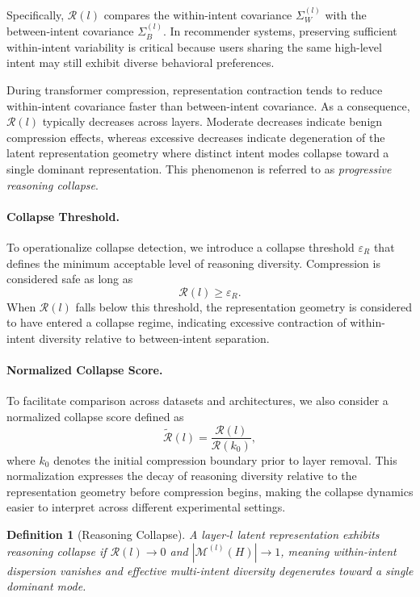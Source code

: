 \documentclass[lettersize,journal]{IEEEtran}
\newtheorem{definition}{Definition}
\begin{document}
Specifically, $\mathcal{R}(l)$ compares the within-intent covariance $\Sigma_W^{(l)}$ with the between-intent covariance $\Sigma_B^{(l)}$. In recommender systems, preserving sufficient within-intent variability is critical because users sharing the same high-level intent may still exhibit diverse behavioral preferences.

During transformer compression, representation contraction tends to reduce within-intent covariance faster than between-intent covariance. As a consequence, $\mathcal{R}(l)$ typically decreases across layers. Moderate decreases indicate benign compression effects, whereas excessive decreases indicate degeneration of the latent representation geometry where distinct intent modes collapse toward a single dominant representation. This phenomenon is referred to as \emph{progressive reasoning collapse}.

\paragraph{Collapse Threshold.}
To operationalize collapse detection, we introduce a collapse threshold $\varepsilon_R$ that defines the minimum acceptable level of reasoning diversity. Compression is considered safe as long as
\[
\mathcal{R}(l) \geq \varepsilon_R .
\]
When $\mathcal{R}(l)$ falls below this threshold, the representation geometry is considered to have entered a collapse regime, indicating excessive contraction of within-intent diversity relative to between-intent separation.

\paragraph{Normalized Collapse Score.}
To facilitate comparison across datasets and architectures, we also consider a normalized collapse score defined as
\[
\tilde{\mathcal{R}}(l) = \frac{\mathcal{R}(l)}{\mathcal{R}(k_0)},
\]
where $k_0$ denotes the initial compression boundary prior to layer removal. This normalization expresses the decay of reasoning diversity relative to the representation geometry before compression begins, making the collapse dynamics easier to interpret across different experimental settings.

\begin{definition}[Reasoning Collapse]
A layer-$l$ latent representation exhibits \emph{reasoning collapse} if $\mathcal{R}(l) \to 0$ and $|\mathcal{M}^{(l)}(H)| \to 1$, meaning within-intent dispersion vanishes and effective multi-intent diversity degenerates toward a single dominant mode.
\end{definition}
\end{document}
